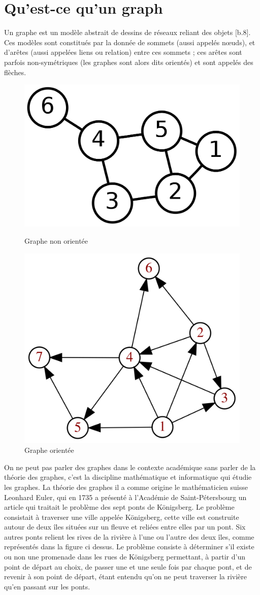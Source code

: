 \section{Qu’est-ce qu’un graph}
Un graphe est un modèle abstrait de dessins de réseaux reliant des objets [b.8]. Ces modèles sont constitués par la donnée de sommets (aussi appelés nœuds), et d'arêtes (aussi appelées liens ou relation) entre ces sommets ; ces arêtes sont parfois non-symétriques (les graphes sont alors dits orientés) et sont appelés des flèches.\\

\begin{figure}[H]  
  \centering
    \includegraphics[width=0.5 \textwidth]{chapitre2/Figures/GraphNonOriontee.png}
  \caption{Graphe non orientée}
  \centering
    \includegraphics[width=0.5 \textwidth]{chapitre2/Figures/GraphOriontee.png}
  \caption{Graphe orientée}
\end{figure}

On ne peut pas parler des graphes dans le contexte académique sans parler de la théorie des graphes, c’est la discipline mathématique et informatique qui étudie les graphes. La théorie des graphes il a comme origine le mathématicien suisse Leonhard Euler, qui en 1735 a présenté à l'Académie de Saint-Pétersbourg un article qui traitait le problème des sept ponts de Königsberg. Le problème consistait à traverser une ville appelée Königsberg, cette ville est construite autour de deux îles situées sur un fleuve et reliées entre elles par un pont. Six autres ponts relient les rives de la rivière à l'une ou l'autre des deux îles, comme représentés dans la figure ci dessus. Le problème consiste à déterminer s'il existe ou non une promenade dans les rues de Königsberg permettant, à partir d'un point de départ au choix, de passer une et une seule fois par chaque pont, et de revenir à son point de départ, étant entendu qu'on ne peut traverser la rivière qu'en passant sur les ponts.\\

